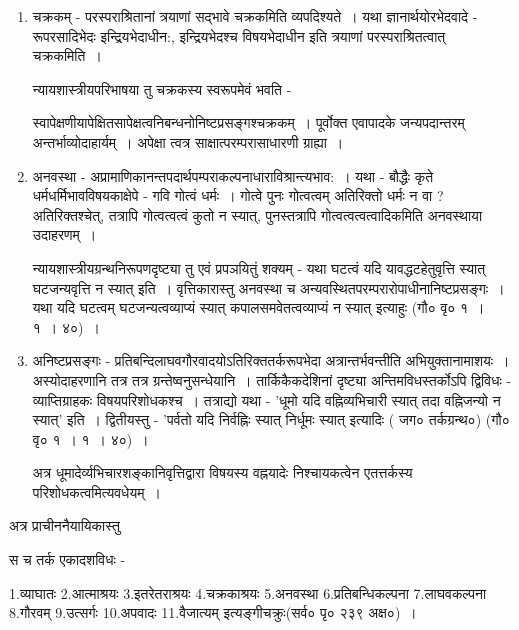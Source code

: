{\begin{enumerate}
न्यायशास्त्रीयपरिभाषया तु अन्योन्याश्रयस्य स्वरूपमेवं भवति - 

स्वापेक्षापेक्षितत्वनिबन्धनोऽनिष्टप्रसङ्गोऽन्योन्याश्रयः~। अस्योदाहरणम् - 'यथा अयं घटो यद्येतद्धटज्ञानजन्यज्ञानविषयः स्यात् एतद्धटभिन्नः स्यात् इति~। अत्रापि उत्पत्तौ स्थितौ च उपर्युक्तरीत्या द्वैविध्यं स्वयमुदाहार्यम्~। 
\item	चक्रकम् - परस्पराश्रितानां त्रयाणां सद्भावे चक्रकमिति व्यपदिश्यते~। यथा  ज्ञानार्थयोरभेदवादे - रूपरसादिभेदः इन्द्रियभेदाधीन:, इन्द्रियभेदश्च विषयभेदाधीन इति त्रयाणां परस्पराश्रितत्वात् चक्रकमिति~। 

न्यायशास्त्रीयपरिभाषया तु चक्रकस्य स्वरूपमेवं भवति -  

स्वापेक्षणीयापेक्षितसापेक्षत्वनिबन्धनोनिष्टप्रसङ्गश्चक्रकम्~। पूर्वोक्त एवापादके जन्य\-पदान्तरम् अन्तर्भाव्योदाहार्यम्~। अपेक्षा त्वत्र साक्षात्परम्परासाधारणी ग्राह्या~। 
\item	अनवस्था - अप्रामाणिकानन्तपदार्थपम्पराकल्पनाधाराविश्रान्त्यभाव:~। यथा - बौद्धैः  कृते धर्मधर्मिभावविषयकाक्षेपे - गवि गोत्वं धर्मः~। गोत्वे पुनः गोत्वत्वम् अतिरिक्तो धर्मः न वा ? अतिरिक्तश्चेत्, तत्रापि गोत्वत्वत्वं कुतो न स्यात्, पुनस्तत्रापि गोत्वत्वत्वत्वादिकमिति अनवस्थाया उदाहरणम्~। 

न्यायशास्त्रीयग्रन्थनिरूपणदृष्ट्या तु एवं प्रपञयितुं शक्यम् - यथा घटत्वं यदि यावद्धटहेतुवृत्ति स्यात् घटजन्यवृत्ति न स्यात् इति~। वृत्तिकारास्तु अनवस्था च अन्यवस्थितपरम्परारोपाधीनानिष्टप्रसङ्गः~। यथा यदि घटत्वम् घटजन्यत्वव्याप्यं स्यात् कपालसमवेतत्वव्याप्यं न स्यात् इत्याहुः (गौ० वृ० १~। १~। ४०)~। 
\item	अनिष्टप्रसङ्गः - प्रतिबन्दिलाघवगौरवादयोऽतिरिक्ततर्करूपभेदा अत्रान्तर्भवन्तीति  \break अभियुक्तानामाशयः~। अस्योदाहरणानि तत्र तत्र ग्रन्तेष्वनुसन्धेयानि~। तार्किकैकदेशिनां दृष्ट्या अन्तिमविधस्तर्कोऽपि द्विविधः -  व्याप्तिग्राहकः विषयपरिशोधकश्च~। तत्राद्यो यथा - 'धूमो यदि वह्निव्यभिचारी स्यात् तदा वह्निजन्यो न स्यात्' इति~। द्विती\-यस्तु - 'पर्वतो यदि निर्वह्निः स्यात् निर्धूमः स्यात् इत्यादिः ( जग० तर्कग्रन्थ०) (गौ० वृ० १~। १~। ४०)~। 

अत्र धूमादेर्व्यभिचारशङ्कानिवृत्तिद्वारा विषयस्य वह्नयादेः निश्चायकत्वेन एतत्तर्कस्य परिशोधकत्वमित्यवधेयम्~। 
\end{enumerate}

अत्र प्राचीननैयायिकास्तु 

स च तर्क एकादशविधः - 

1.व्याघातः 2.आत्माश्रयः 3.इतरेतराश्रयः 4.चक्रकाश्रयः 5.अनवस्था 6.प्रतिबन्धि\-कल्पना  7.लाघवकल्पना 8.गौरवम् 9.उत्सर्गः 10.अपवादः 11.वैजात्यम् इत्यङ्गीचक्रुः(सर्व० पृ० २३९ अक्ष०)~। 

}
